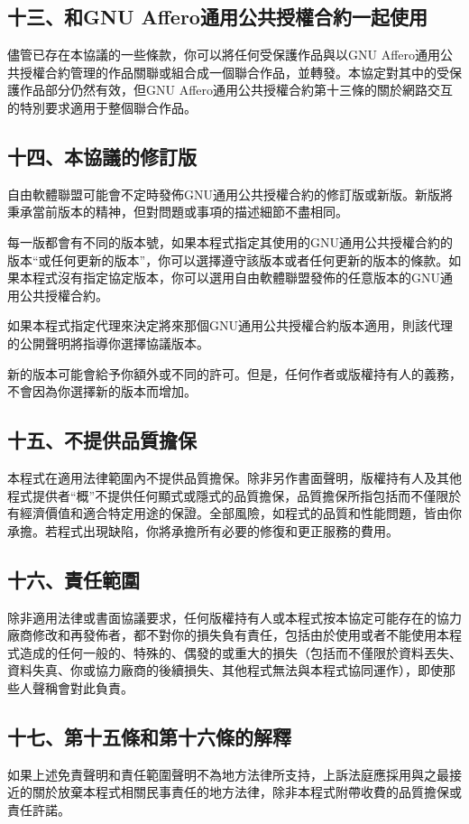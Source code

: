 \subsection{十三、和GNU Affero通用公共授權合約一起使用}
儘管已存在本協議的一些條款，你可以將任何受保護作品與以GNU Affero通用公共授權合約管理的作品關聯或組合成一個聯合作品，並轉發。本協定對其中的受保護作品部分仍然有效，但GNU Affero通用公共授權合約第十三條的關於網路交互的特別要求適用于整個聯合作品。
\subsection{十四、本協議的修訂版}
自由軟體聯盟可能會不定時發佈GNU通用公共授權合約的修訂版或新版。新版將秉承當前版本的精神，但對問題或事項的描述細節不盡相同。\par
每一版都會有不同的版本號，如果本程式指定其使用的GNU通用公共授權合約的版本“或任何更新的版本”，你可以選擇遵守該版本或者任何更新的版本的條款。如果本程式沒有指定協定版本，你可以選用自由軟體聯盟發佈的任意版本的GNU通用公共授權合約。\par
如果本程式指定代理來決定將來那個GNU通用公共授權合約版本適用，則該代理的公開聲明將指導你選擇協議版本。\par
新的版本可能會給予你額外或不同的許可。但是，任何作者或版權持有人的義務，不會因為你選擇新的版本而增加。
\subsection{十五、不提供品質擔保}
本程式在適用法律範圍內不提供品質擔保。除非另作書面聲明，版權持有人及其他程式提供者“概”不提供任何顯式或隱式的品質擔保，品質擔保所指包括而不僅限於有經濟價值和適合特定用途的保證。全部風險，如程式的品質和性能問題，皆由你承擔。若程式出現缺陷，你將承擔所有必要的修復和更正服務的費用。
\subsection{十六、責任範圍}
除非適用法律或書面協議要求，任何版權持有人或本程式按本協定可能存在的協力廠商修改和再發佈者，都不對你的損失負有責任，包括由於使用或者不能使用本程式造成的任何一般的、特殊的、偶發的或重大的損失（包括而不僅限於資料丟失、資料失真、你或協力廠商的後續損失、其他程式無法與本程式協同運作），即使那些人聲稱會對此負責。
\subsection{十七、第十五條和第十六條的解釋}
如果上述免責聲明和責任範圍聲明不為地方法律所支持，上訴法庭應採用與之最接近的關於放棄本程式相關民事責任的地方法律，除非本程式附帶收費的品質擔保或責任許諾。
